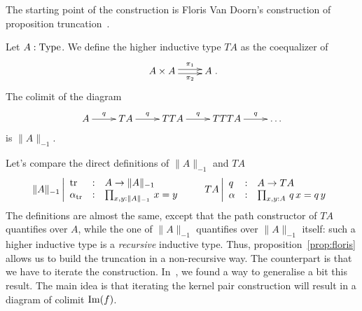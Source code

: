 The starting point of the construction is Floris Van Doorn's
construction of proposition truncation~\cite{floris}. 

\begin{prop}\label{prop:floris}
  Let $A:\operatorname{Type}$. We define the higher inductive type $TA$ as the
  coequalizer of
  \[ \xymatrix{ A\times A \ar@<-.5ex>[r]_-{\pi_2}
      \ar@<.5ex>[r]^-{\pi_1} & A }.\]
  The colimit of the diagram
  \[ \xymatrix{
      A \ar[r]^-q& TA \ar[r]^-q& TTA \ar[r]^-q& TTTA \ar[r]^-q& \dots
    }\]
  is $\|A\|_{-1}$.
\end{prop}
Let's compare the direct definitions of $\|A\|_{-1}$ and $TA$
\[
  \|A\|_{-1} \left|
    \begin{array}{lll}
      \operatorname{tr} &:& A\to\|A\|_{-1} \\
      \alpha_{\operatorname{tr}} &:& \prod_{x,y:\|A\|_{-1}}\, x=y
    \end{array}
  \right.
  \qquad
  TA \left|
    \begin{array}{lll}
      q &:& A\to TA \\
      \alpha &:& \prod_{x,y:A}\, q\, x=q\, y
    \end{array}
  \right.
\]
The definitions are almost the same, except that the path constructor
of $TA$ quantifies over $A$, while the one of $\|A\|_{-1}$ quantifies
over $\|A\|_{-1}$ itself: such a higher inductive type is a {\em
  recursive} inductive type. Thus, proposition~\ref{prop:floris}
allows us to build the truncation in a non-recursive way. The
counterpart is that we have to iterate the
construction. In~\cite{boulier}, we found a way to generalise a bit
this result. The main idea is that iterating the kernel pair
construction will result in a diagram of colimit $\operatorname{Im}(f)$.

